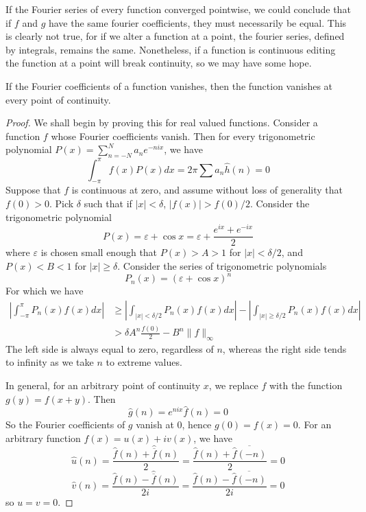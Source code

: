 If the Fourier series of every function converged pointwise, we could conclude that if $f$ and $g$ have the same fourier coefficients, they must necessarily be equal. This is clearly not true, for if we alter a function at a point, the fourier series, defined by integrals, remains the same. Nonetheless, if a function is continuous editing the function at a point will break continuity, so we may have some hope.

\begin{theorem}
    If the Fourier coefficients of a function vanishes, then the function vanishes at every point of continuity.
\end{theorem}
\begin{proof}
    We shall begin by proving this for real valued functions. Consider a function $f$ whose Fourier coefficients vanish. Then for every trigonometric polynomial $P(x) = \sum_{n = -N}^N a_n e^{-nix}$, we have
    \[ \int_{-\pi}^\pi f(x) P(x) dx = 2 \pi \sum a_n \hat{h}(n) = 0 \]
    Suppose that $f$ is continuous at zero, and assume without loss of generality that $f(0) > 0$. Pick $\delta$ such that if $|x| < \delta$, $|f(x)| > f(0)/2$. Consider the trigonometric polynomial
    \[ P(x) = \varepsilon + \cos x = \varepsilon + \frac{e^{ix} + e^{-ix}}{2} \]
    where $\varepsilon$ is chosen small enough that $P(x) > A > 1$ for $|x| < \delta/2$, and $P(x) < B < 1$ for $|x| \geq \delta$. Consider the series of trigonometric polynomials
    \[ P_n(x) = (\varepsilon + \cos x)^n \]
    For which we have
    \begin{align*}
        \left| \int_{-\pi}^\pi P_n(x) f(x) dx \right| &\geq \left| \int_{|x| < \delta/2} P_n(x) f(x) dx \right| - \left| \int_{|x| \geq \delta/2} P_n(x) f(x) dx \right|\\
        &> \delta A^n \frac{f(0)}{2} - B^n \| f \|_{\infty}
    \end{align*}
    The left side is always equal to zero, regardless of $n$, whereas the right side tends to infinity as we take $n$ to extreme values.

    In general, for an arbitrary point of continuity $x$, we replace $f$ with the function $g(y) = f(x+y)$. Then
    \[ \hat{g}(n) = e^{nix} \hat{f}(n) = 0 \]
    So the Fourier coefficients of $g$ vanish at $0$, hence $g(0) = f(x) = 0$. For an arbitrary function $f(x) = u(x) + i v(x)$, we have
    \[ \hat{u}(n) = \frac{\hat{f}(n) + \widehat{\overline{f}}(n)}{2} = \frac{\hat{f}(n) + \overline{\hat{f}(-n)}}{2} = 0 \]
    \[ \hat{v}(n) = \frac{\hat{f}(n) - \widehat{\overline{f}}(n)}{2i} = \frac{\hat{f}(n) - \overline{\hat{f}(-n)}}{2i} = 0 \]
    so $u = v = 0$.
\end{proof}


